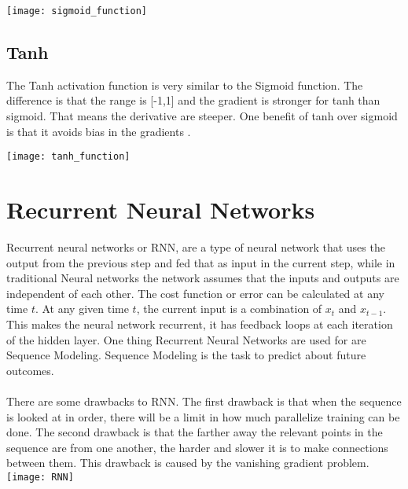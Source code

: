 \texttt{[image: sigmoid\_function]}

\subsection{Tanh}
The Tanh activation function is very similar to the Sigmoid function. The difference is that the range is [-1,1] and the gradient is stronger for tanh than sigmoid. That means the derivative are steeper. One benefit of tanh over sigmoid is that it avoids bias in the gradients \cite{Tan_h}.

\texttt{[image: tanh\_function]}

\section{Recurrent Neural Networks}
Recurrent neural networks or RNN, are a type of neural network that uses the output from the previous step and fed that as input in the current step, while in traditional Neural networks the network assumes that the inputs and outputs are independent of each other. The cost function or error can be calculated at any time $t$. At any given time $t$, the current input is a combination of $x_t$ and $x_{t-1}$. This makes the neural network recurrent, it has feedback loops at each iteration of the hidden layer. One thing Recurrent Neural Networks are used for are Sequence Modeling. Sequence Modeling is the task to predict about future outcomes.\\\\
There are some drawbacks to RNN. The first drawback is that when the sequence is looked at in order, there will be a limit in how much parallelize training can be done. The second drawback is that the farther away the relevant points in the sequence are from one another, the harder and slower it is to make connections between them. This drawback is caused by the vanishing gradient problem.\\

\texttt{[image: RNN]}

